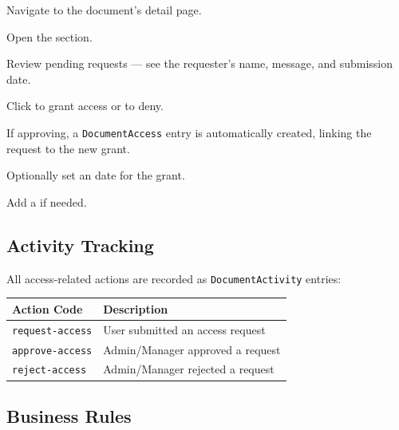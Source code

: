 \begin{ugSteps}
  \item Navigate to the document's detail page.
  \item Open the  section.
  \item Review pending requests --- see the requester's name,
        message, and submission date.
  \item Click  to grant access or
         to deny.
  \item If approving, a \texttt{DocumentAccess} entry is
        automatically created, linking the request to the
        new grant.
  \item Optionally set an  date for the
        grant.
  \item Add a  if needed.
\end{ugSteps}

\subsection{Activity Tracking}

All access-related actions are recorded as
\texttt{DocumentActivity} entries:

\begin{tabularx}{\textwidth}{@{} l X @{}}
  \toprule
  \textbf{Action Code} & \textbf{Description} \\
  \midrule
  \texttt{request-access}
    & User submitted an access request \\
  \texttt{approve-access}
    & Admin/Manager approved a request \\
  \texttt{reject-access}
    & Admin/Manager rejected a request \\
  \bottomrule
\end{tabularx}

\subsection{Business Rules}

